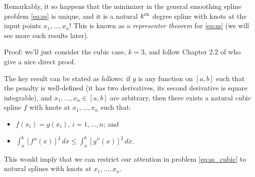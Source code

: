 \documentclass{article}
\begin{document}
Remarkably, it so happens that the minimizer in the general smoothing spline
problem \eqref{eq:ss} is unique, and it is a natural $k^{\text{th}}$ degree spline with 
knots at the input points $x_1,\dots,x_n$! This is known as a \emph{representer
  theorem} for \eqref{eq:ss} (we will see more such results later). 

Proof: we'll just consider the cubic case, $k=3$, and follow Chapter 2.2 of
\citet{green1993nonparametric} who give a nice direct proof.   

The key result can be stated as follows: if $g$ is any function on $[a,b]$ such
that the penalty is well-defined (it has two derivatives, its second derivative
is square integrable), and $x_1,\dots,x_n \in [a,b]$ are arbitrary, then there
exists a natural cubic spline $f$ with knots at $x_1,\dots,x_n$ such that: 
\begin{itemize}
\item $f(x_i) = g(x_i)$, $i=1,\dots,n$; and 
\item $\int_a^b [f''(x)]^2 \, dx \leq \int_a^b [g''(x)]^2 \, dx$.
\end{itemize}

This would imply that we can restrict our attention in problem
\eqref{eq:ss_cubic} to natural splines with knots at $x_1,\dots,x_n$. 
\end{document}

